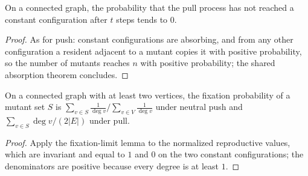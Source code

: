 \begin{theorem}\label{thm:pull-absorption}
\leanok{}
On a connected graph, the probability that the pull process has not reached a constant
configuration after $t$ steps tends to $0$.
\end{theorem}
\begin{proof}\leanok
As for push: constant configurations are absorbing, and from any other configuration a resident
adjacent to a mutant copies it with positive probability, so the number of mutants reaches $n$
with positive probability; the shared absorption theorem concludes.
\end{proof}
\begin{theorem}\label{thm:pushpull}
\leanok{}
On a connected graph with at least two vertices, the fixation probability of a mutant set $S$
is $\sum_{v\in S}\frac1{\deg v}\big/\sum_{v\in V}\frac1{\deg v}$ under neutral push and
$\sum_{v\in S}\deg v/(2|E|)$ under pull.
\end{theorem}
\begin{proof}\leanok
Apply the fixation-limit lemma to the normalized reproductive values, which are invariant and
equal to $1$ and $0$ on the two constant configurations; the denominators are positive because
every degree is at least $1$.
\end{proof}


